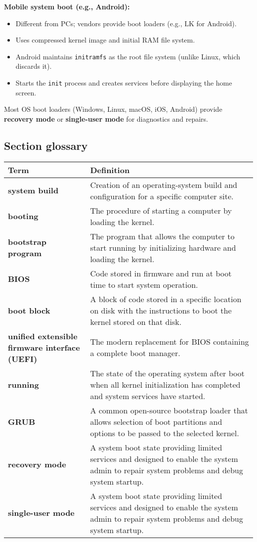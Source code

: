 \textbf{Mobile system boot (e.g., Android):}
\begin{itemize}
    \item Different from PCs; vendors provide boot loaders (e.g., LK for Android).
    \item Uses compressed kernel image and initial RAM file system.
    \item Android maintains \texttt{initramfs} as the root file system (unlike Linux, which discards it).
    \item Starts the \texttt{init} process and creates services before displaying the home screen.
\end{itemize}
Most OS boot loaders (Windows, Linux, macOS, iOS, Android) provide \textbf{recovery mode} or \textbf{single-user mode} for diagnostics and repairs.

\subsection*{Section glossary}

\begin{tabular}{>{\raggedright}p{} >{\raggedright\arraybackslash}p{}}
\toprule
\textbf{Term} & \textbf{Definition} \\
\midrule
\textbf{system build} & Creation of an operating-system build and configuration for a specific computer site. \\
\textbf{booting} & The procedure of starting a computer by loading the kernel. \\
\textbf{bootstrap program} & The program that allows the computer to start running by initializing hardware and loading the kernel. \\
\textbf{BIOS} & Code stored in firmware and run at boot time to start system operation. \\
\textbf{boot block} & A block of code stored in a specific location on disk with the instructions to boot the kernel stored on that disk. \\
\textbf{unified extensible firmware interface (UEFI)} & The modern replacement for BIOS containing a complete boot manager. \\
\textbf{running} & The state of the operating system after boot when all kernel initialization has completed and system services have started. \\
\textbf{GRUB} & A common open-source bootstrap loader that allows selection of boot partitions and options to be passed to the selected kernel. \\
\textbf{recovery mode} & A system boot state providing limited services and designed to enable the system admin to repair system problems and debug system startup. \\
\textbf{single-user mode} & A system boot state providing limited services and designed to enable the system admin to repair system problems and debug system startup. \\
\bottomrule
\end{tabular}
\vspace{\baselineskip}
